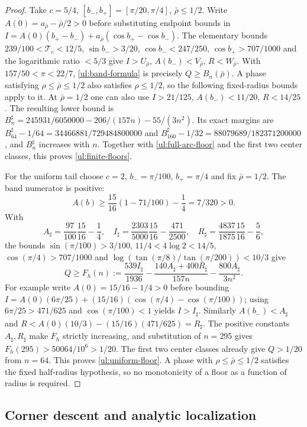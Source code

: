 \begin{proof}
Take $c=5/4$, $[b_-,b_+]=[\pi/20,\pi/4]$, $\bar{\rho}\leq1/2$.
Write $A(0)=a_{\bar\rho}-\bar\rho/2>0$ before substituting
endpoint bounds in $I=A(0)(b_+-b_-)+a_{\bar\rho}(\cos b_+-\cos b_-)$.
The elementary bounds
$239/100<\mathcal T_c<12/5$, $\sin b_->3/20$,
$\cos b_-<247/250$, $\cos b_+>707/1000$ and the logarithmic ratio
$<5/3$ give $I>U_{\bar{\rho}}$, $A(b_-)<V_{\bar{\rho}}$, $R<W_{\bar{\rho}}$.  With
$157/50<\pi<22/7$, \eqref{ul:band-formula} is precisely $Q\geq B_n(\bar{\rho})$.
A phase satisfying $\rho\leq\bar\rho\leq1/2$ also satisfies
$\rho\leq1/2$, so the following fixed-radius bounds apply to it.
At $\bar{\rho}=1/2$ one can also use $I>21/125$, $A(b_-)<11/20$, $R<14/25$.
The resulting lower bound is
$B_n^\sharp=245931/6050000-206/(157n)-55/(3n^2)$.  Its exact margins are
$B_{64}^\sharp-1/64=34466881/729484800000$ and
$B_{160}^\sharp-1/32=88079689/182371200000$, and $B_n^\sharp$ increases with $n$.
Together with \eqref{ul:full-arc-floor} and the first two center
classes, this proves \eqref{ul:finite-floors}.

For the uniform tail choose $c=2$, $b_-=\pi/100$,
$b_+=\pi/4$ and fix $\bar\rho=1/2$. The band numerator is positive:
\[
 A(b)\geq\frac{15}{16}(1-71/100)-\frac14=7/320>0.
\]
With
\[
 A_\sharp =\frac{97}{100}\frac{15}{16}-\frac14,\quad
 I_\sharp =\frac{2303}{5000}\frac{15}{16}-\frac{471}{2500},\quad
 R_\sharp =\frac{4837}{1875}\frac{15}{16}-\frac56,
\]
the bounds $\sin(\pi/100)>3/100$, $11/4<4\log2<14/5$,
$\cos(\pi/4)>707/1000$ and
$\log(\tan(\pi/8)/\tan(\pi/200))<10/3$ give
\[
 Q\geq F_h(n):=\frac{539I_\sharp}{1936}
              -\frac{140A_\sharp+400R_\sharp}{157n}
              -\frac{800A_\sharp}{3n^2}.
\]
For example write $A(0)=15/16-1/4>0$ before bounding
$I=A(0)(6\pi/25)+(15/16)(\cos(\pi/4)-\cos(\pi/100))$;
using $6\pi/25>471/625$ and $\cos(\pi/100)<1$ yields $I>I_\sharp$.
Similarly $A(b_-)<A_\sharp$ and
$R<A(0)(10/3)-(15/16)(471/625)=R_\sharp$.
The positive constants $A_\sharp,R_\sharp$ make $F_h$ strictly increasing,
and substitution of $n=295$ gives $F_h(295)>50064/10^6>1/20$.
The first two center classes already give $Q>1/20$ from $n=64$.
This proves \eqref{ul:uniform-floor}. A phase with
$\rho\leq\bar\rho\leq1/2$ satisfies the fixed half-radius hypothesis,
so no monotonicity of a floor as a function of radius is required.
\end{proof}

\subsection{Corner descent and analytic localization}

